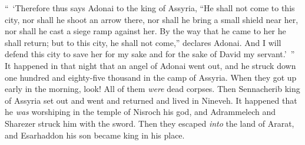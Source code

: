 \begin{biblechapter}
\verse “ ‘Therefore thus says Adonai to the king of Assyria, “He shall not come to this city, nor shall he shoot an arrow there, nor shall he bring a small shield near her, nor shall he cast a siege ramp against her.
\verse By the way that he came to her he shall return; but to this city, he shall not come,” declares Adonai.
\verse And I will defend this city to save her for my sake and for the sake of David my servant.’ ”
 It happened in that night that an angel of Adonai went out, and he struck down one hundred and eighty-five thousand in the camp of Assyria. When they got up early in the morning, look! All of them \textit{were} dead corpses.
\verse Then Sennacherib king of Assyria set out and went and returned and lived in Nineveh.
\verse It happened that he \textit{was} worshiping in the temple of Nisroch his god, and Adrammelech and Sharezer struck him with the sword. Then they escaped \textit{into} the land of Ararat, and Esarhaddon his son became king in his place.
\end{biblechapter}

